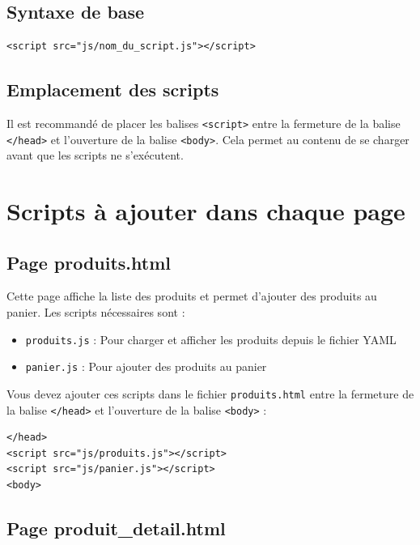 \documentclass[11pt]{article}
\begin{document}
\subsection{Syntaxe de base}

\begin{verbatim}
<script src="js/nom_du_script.js"></script>
\end{verbatim}

\subsection{Emplacement des scripts}

Il est recommandé de placer les balises \texttt{<script>} entre la fermeture de la balise \texttt{</head>} et l'ouverture de la balise \texttt{<body>}. Cela permet au contenu de se charger avant que les scripts ne s'exécutent.

\section{Scripts à ajouter dans chaque page}

\subsection{Page produits.html}

Cette page affiche la liste des produits et permet d'ajouter des produits au panier. Les scripts nécessaires sont :

\begin{itemize}
\item \texttt{produits.js} : Pour charger et afficher les produits depuis le fichier YAML
\item \texttt{panier.js} : Pour ajouter des produits au panier
\end{itemize}

Vous devez ajouter ces scripts dans le fichier \texttt{produits.html} entre la fermeture de la balise \texttt{</head>} et l'ouverture de la balise \texttt{<body>} :

\begin{verbatim}
</head>
<script src="js/produits.js"></script>
<script src="js/panier.js"></script>
<body>
\end{verbatim}

\subsection{Page produit\_detail.html}
\end{document}
